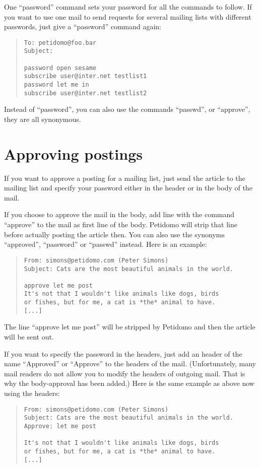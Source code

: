 \documentclass[a4paper,10pt]{scrreprt}
\begin{document}
One ``password'' command sets your password for all the commands to
follow. If you want to use one mail to send requests for several
mailing lists with different passwords, just give a ``password''
command again:
\begin{quote}
\begin{verbatim}
To: petidomo@foo.bar
Subject:

password open sesame
subscribe user@inter.net testlist1
password let me in
subscribe user@inter.net testlist2
\end{verbatim}
\end{quote}

Instead of ``password'', you can also use the commands ``passwd'', or
``approve'', they are all synonymous.

\section{Approving postings}

If you want to approve a posting for a mailing list, just send the
article to the mailing list and specify your password either in the
header or in the body of the mail.

If you choose to approve the mail in the body, add line with the
command ``approve'' to the mail as first line of the body. Petidomo
will strip that line before actually posting the article then. You can
also use the synonyms ``approved'', ``password'' or ``passwd''
instead. Here is an example:
\begin{quote}
\begin{verbatim}
From: simons@petidomo.com (Peter Simons)
Subject: Cats are the most beautiful animals in the world.

approve let me post
It's not that I wouldn't like animals like dogs, birds
or fishes, but for me, a cat is *the* animal to have.
[...]
\end{verbatim}
\end{quote}

The line ``approve let me post'' will be stripped by Petidomo and
then the article will be sent out.

If you want to specify the password in the headers, just add an header
of the name ``Approved'' or ``Approve'' to the headers of the mail.
(Unfortunately, many mail readers do not allow you to modify the
headers of outgoing mail. That is why the body-approval has been
added.) Here is the same example as above now using the headers:
\begin{quote}
\begin{verbatim}
From: simons@petidomo.com (Peter Simons)
Subject: Cats are the most beautiful animals in the world.
Approve: let me post

It's not that I wouldn't like animals like dogs, birds
or fishes, but for me, a cat is *the* animal to have.
[...]
\end{verbatim}
\end{quote}
\end{document}
